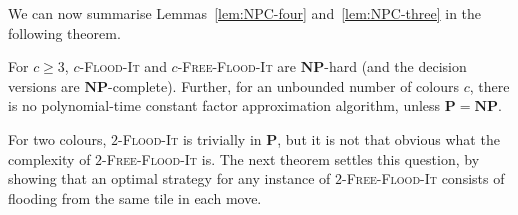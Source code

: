 \documentclass[a4paper,11pt]{llncs}
\newcounter{l}
\renewcommand{\geq}{\geqslant}
\newcommand{\Ptime}{\ensuremath{\mathbf{P}}}
\newcommand{\NPtime}{\ensuremath{\mathbf{NP}}}
\newcommand{\Coloroid}[1]{$#1$-\textsc{Flood-It}}
\newcommand{\ColoroidFree}[1]{$#1$-\textsc{Free-Flood-It}}
\begin{document}
We can now summarise Lemmas~\ref{lem:NPC-four} and~\ref{lem:NPC-three} in the following theorem.

\begin{theorem}
    \label{thm:NPC}
    For $c\geq 3$, \Coloroid{c} and \ColoroidFree{c} are \NPtime-hard (and the decision versions are \NPtime-complete). Further, for an unbounded number of colours $c$, there is no polynomial-time constant factor approximation algorithm, unless $\Ptime=\NPtime$.
\end{theorem}

For two colours, \Coloroid{2} is trivially in \Ptime, but it is not that obvious what the complexity of \ColoroidFree{2} is. The next theorem settles this question, by showing that an optimal strategy for any instance of \ColoroidFree{2} consists of flooding from the same tile in each move.
\end{document}
